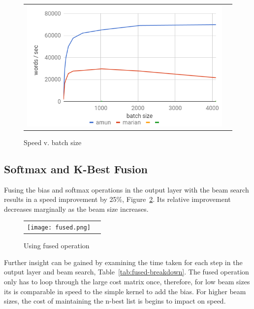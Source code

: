 \documentclass[11pt,a4paper]{article}
\begin{document}
\begin{figure}
\centering
\begin{tabular}{cc}
{\includegraphics[scale=0.35]{batch-size.png}} 
\end{tabular}
\caption{Speed v. batch size}
\label{fig:batch-size}
\end{figure} 


\subsection{Softmax and K-Best Fusion}

Fusing the bias and softmax operations in the output layer with the beam search results in a speed improvement by 25\%, Figure~\ref{fig:fused}. Its relative improvement decreases marginally as the beam size increases.

\begin{figure}
\centering
\begin{tabular}{cc}
{\texttt{[image: fused.png]}} 
\end{tabular}
\caption{Using fused operation}
\label{fig:fused}
\end{figure} 

Further insight can be gained by examining the time taken for each step in the output layer and beam search, Table~\ref{tab:fused-breakdown}. The fused operation only has to loop through the large cost matrix once, therefore, for low beam sizes its is comparable in speed to the simple kernel to add the bias. For higher beam sizes, the cost of maintaining the n-best list is begins to impact on speed.
\end{document}
